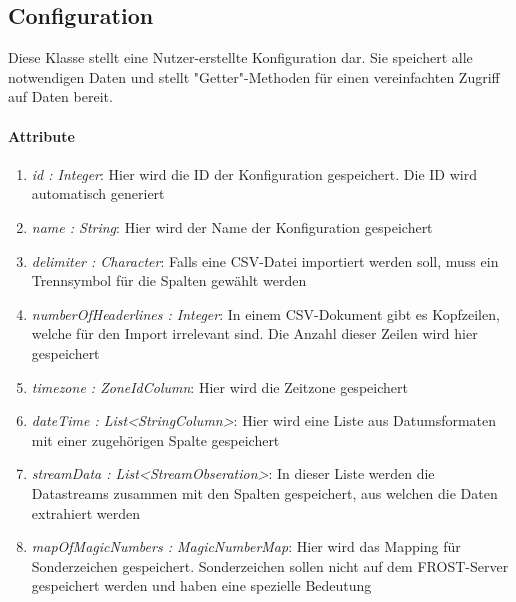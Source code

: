 \subsection{Configuration}
Diese Klasse stellt eine Nutzer-erstellte Konfiguration dar. 
Sie speichert alle notwendigen Daten und stellt "{Getter}"{-Methoden} für einen vereinfachten Zugriff auf Daten bereit.

\paragraph{Attribute}

\begin{enumerate}[-]
	\item \textit{id : Integer}: Hier wird die ID der Konfiguration gespeichert. Die ID wird automatisch generiert
	
	\item \textit{name : String}: Hier wird der Name der Konfiguration gespeichert
	
	\item \textit{delimiter : Character}: Falls eine CSV-Datei importiert werden soll, muss ein Trennsymbol für die Spalten gewählt werden
	
	\item \textit{numberOfHeaderlines : Integer}: In einem CSV-Dokument gibt es Kopfzeilen, welche für den Import irrelevant sind. Die Anzahl dieser Zeilen wird hier gespeichert
	
	\item \textit{timezone : ZoneIdColumn}: Hier wird die Zeitzone gespeichert
	
	\item \textit{dateTime : List<StringColumn>}: Hier wird eine Liste aus Datumsformaten mit einer zugehörigen Spalte gespeichert 
	
	\item \textit{streamData : List<StreamObseration>}: In dieser Liste werden die Datastreams zusammen mit den Spalten gespeichert, aus welchen die Daten extrahiert werden
	
	\item \textit{mapOfMagicNumbers : MagicNumberMap}: Hier wird das Mapping für Sonderzeichen gespeichert. Sonderzeichen sollen nicht auf dem FROST-Server gespeichert werden und haben eine spezielle Bedeutung
\end{enumerate}

